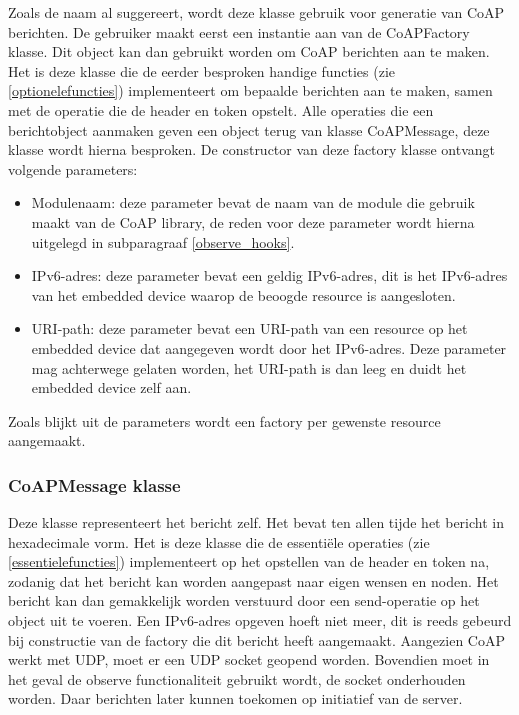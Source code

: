Zoals de naam al suggereert, wordt deze klasse gebruik voor generatie van CoAP berichten. De gebruiker maakt eerst een instantie aan van de CoAPFactory klasse. Dit object kan dan gebruikt worden om CoAP berichten aan te maken. Het is deze klasse die de eerder besproken handige functies (zie \ref{optionelefuncties}) implementeert om bepaalde berichten aan te maken, samen met de operatie die de header en token opstelt. Alle operaties die een berichtobject aanmaken geven een object terug van klasse CoAPMessage, deze klasse wordt hierna besproken. De constructor van deze factory klasse ontvangt volgende parameters:
\begin{itemize}
\item Modulenaam: deze parameter bevat de naam van de module die gebruik maakt van de CoAP library, de reden voor deze parameter wordt hierna uitgelegd in subparagraaf \ref{observe_hooks}.
\item IPv6-adres: deze parameter bevat een geldig IPv6-adres, dit is het IPv6-adres van het embedded device waarop de beoogde resource is aangesloten.
\item URI-path: deze parameter bevat een URI-path van een resource op het embedded device dat aangegeven wordt door het IPv6-adres. Deze parameter mag achterwege gelaten worden, het URI-path is dan leeg en duidt het embedded device zelf aan.
\end{itemize}
Zoals blijkt uit de parameters wordt een factory per gewenste resource aangemaakt.

\subsubsection{CoAPMessage klasse}

Deze klasse representeert het bericht zelf. Het bevat ten allen tijde het bericht in hexadecimale vorm. Het is deze klasse die de essenti\"{e}le operaties (zie \ref{essentielefuncties}) implementeert op het opstellen van de header en token na, zodanig dat het bericht kan worden aangepast naar eigen wensen en noden. Het bericht kan dan gemakkelijk worden verstuurd door een send-operatie op het object uit te voeren. Een IPv6-adres opgeven hoeft niet meer, dit is reeds gebeurd bij constructie van de factory die dit bericht heeft aangemaakt. Aangezien CoAP werkt met UDP, moet er een UDP socket geopend worden. Bovendien moet in het geval de observe functionaliteit gebruikt wordt, de socket onderhouden worden. Daar berichten later kunnen toekomen op initiatief van de server.

